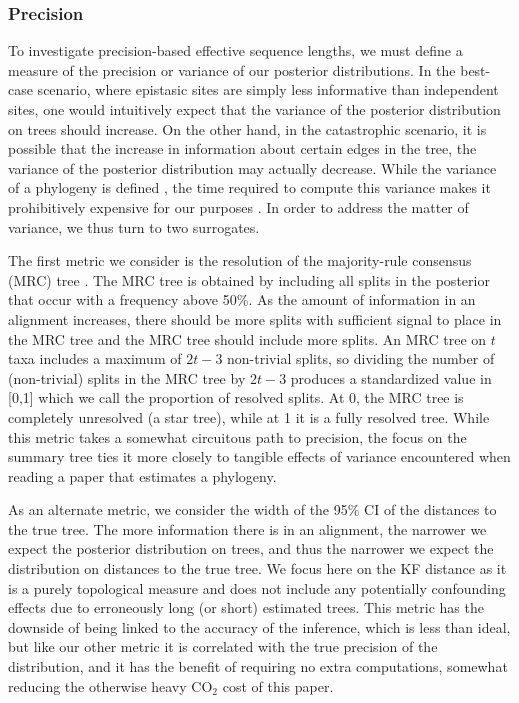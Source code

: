 \documentclass[11pt]{article}
\begin{document}
\subsubsection*{Precision\label{sec:precision}}
To investigate precision-based effective sequence lengths, we must define a measure of the precision or variance of our posterior distributions.
In the best-case scenario, where epistasic sites are simply less informative than independent sites, one would intuitively expect that the variance of the posterior distribution on trees should increase.
On the other hand, in the catastrophic scenario, it is possible that the increase in information about certain edges in the tree, the variance of the posterior distribution may actually decrease.
While the variance of a phylogeny is defined \citep[e.g.\ ][]{willis2019confidence}, the time required to compute this variance makes it prohibitively expensive for our purposes \citep{brown2019mean}.
In order to address the matter of variance, we thus turn to two surrogates.

The first metric we consider is the resolution of the majority-rule consensus (MRC) tree \citep{}.
The MRC tree is obtained by including all splits in the posterior that occur with a frequency above 50\%.
As the amount of information in an alignment increases, there should be more splits with sufficient signal to place in the MRC tree and the MRC tree should include more splits.
An MRC tree on $t$ taxa includes a maximum of $2 t - 3$ non-trivial splits, so dividing the number of (non-trivial) splits in the MRC tree by $2 t - 3$ produces a standardized value in [0,1] which we call the proportion of resolved splits.
At 0, the MRC tree is completely unresolved (a star tree), while at 1 it is a fully resolved tree.
While this metric takes a somewhat circuitous path to precision, the focus on the summary tree ties it more closely to tangible effects of variance encountered when reading a paper that estimates a phylogeny.

As an alternate metric, we consider the width of the 95\% CI of the distances to the true tree.
The more information there is in an alignment, the narrower we expect the posterior distribution on trees, and thus the narrower we expect the distribution on distances to the true tree.
We focus here on the KF distance as it is a purely topological measure and does not include any potentially confounding effects due to erroneously long (or short) estimated trees.
This metric has the downside of being linked to the accuracy of the inference, which is less than ideal, but like our other metric it is correlated with the true precision of the distribution, and it has the benefit of requiring no extra computations, somewhat reducing the otherwise heavy CO$_2$ cost of this paper.
\end{document}
